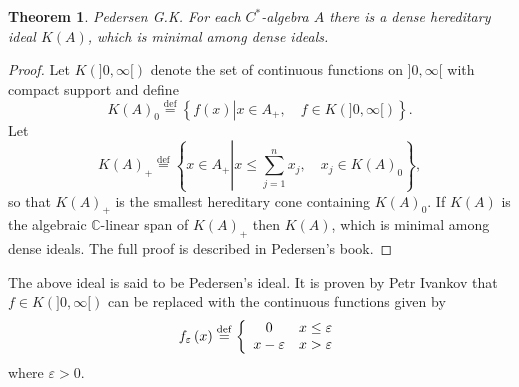 \documentclass{beamer}
\theoremstyle{plain}
\newtheorem{thm}{Theorem}%
\newcommand{\be}{\begin{equation}}
\newcommand{\ee}{\end{equation}}
\newcommand{\C}{\mathbb{C}}
\newcommand{\eps}{\varepsilon}                    %
\newcommand{\bydef}{\stackrel{\mathrm{def}}{=}}
\begin{document}
\begin{frame}
	\begin{thm}\label{pedersen_ideal_thm} \alert{Pedersen G.K.}
		For each $C^*$-algebra $A$ there is a dense hereditary ideal $K(A)$,
		which is minimal among dense ideals.
		
	\end{thm}
	\begin{proof}
		Let $K(]0, \infty [)$ denote the set of continuous functions on $]0, \infty [$ with 
		compact support and define 
		\be\label{pedersen_k0_eqn}
		K\left( A \right)_0 \bydef \left\{f\left(x\right) \left|x \in A_+, \quad f \in K(]0, \infty [) \right.\right\}.
		\ee
		Let 
		\be\label{pedersen_k_plus_eqn}
		K\left( A \right)_+ \bydef \left\{x \in A_+ \left|x \le \sum_{j = 1}^nx_j, \quad x_j \in  	K\left( A \right)_0\right.\right\}, 	
		\ee
		so that $	K\left( A \right)_+$ is the smallest hereditary cone  containing $K\left( A \right)_0$. If $K(A)$ 
		is  the algebraic  $\C$-linear span of $K(A)_+$ then $K(A)$,
		which is minimal among dense ideals. The full  proof is  described in Pedersen's book.
	\end{proof}
	
\end{frame}

\begin{frame}
	The above ideal is said to be \alert{Pedersen's ideal}. It is  proven by \alert{Petr Ivankov} that $f \in K(]0, \infty [)$ can be replaced with the continuous functions given by
		$$
		f_\eps\left( x\right)  \bydef\left\{
		\begin{array}{c l}
			0 &x \le \eps \\
			x - \eps & x > \eps
		\end{array}\right.
	$$
	where $\eps > 0$.
\end{frame}
\end{document}
